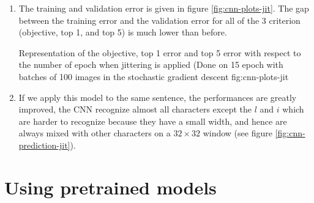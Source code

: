 \documentclass{article}
\newcommand{\hc}[1]{{\color{highlightcolor} \textbf{#1}}}
\begin{document}
\begin{enumerate}
\item The training and validation error is given in figure
  \ref{fig:cnn-plots-jit}. The gap between the training error and the
  validation error for all of the 3 criterion (objective, top 1, and top
  5) is much lower than before.

  \triplefign
  {}
  {}
  {}
  {Representation of the objective, top 1 error and top 5 error with
    respect to the number of epoch when jittering is applied (Done on 15
    epoch with batches of 100 images in the stochastic gradient descent}
  {fig:cnn-plots-jit}

\item If we apply this model to the same sentence, the performances
  are greatly improved, the CNN recognize almost all characters except
  the $l$ and $i$ which are harder to recognize because they have a
  small width, and hence are always mixed with other characters on a
  $32 \times 32$ window (see figure \ref{fig:cnn-prediction-jit}).




\end{enumerate}

\section{Using pretrained models}

\end{document}
